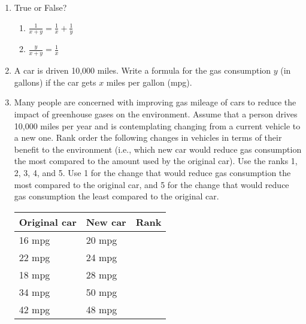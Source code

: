 \documentclass[11pt,dvipsnames]{article}
\begin{document}
\begin{enumerate}[label= {\bf  \arabic*:}]
	\item True or False?
	\begin{enumerate}
		\item $\displaystyle \frac{1}{x+y}=\frac{1}{x}+\frac{1}{y}$
		\item $\displaystyle \frac{y}{x+y}=\frac{1}{x}$
	\end{enumerate}
	\item  A car is driven 10,000 miles. Write a formula for the gas consumption $y$ (in gallons) if the car gets $x$ miles per gallon (mpg).
\item \label{item:bah}Many people are concerned with improving gas mileage of cars to reduce the impact of
greenhouse gases on the environment. Assume that a person drives 10,000 miles per year and is
contemplating changing from a current vehicle to a new one.
Rank order the following changes in vehicles in terms of their benefit to the environment (i.e.,
which new car would reduce gas consumption the most compared to the amount used by the
original car). Use the ranks 1, 2, 3, 4, and 5. Use 1 for the change that would reduce gas
consumption the most compared to the original car, and 5 for the change that would reduce gas
consumption the least compared to the original car. 


\begin{tabular}{|l|l|l|}
\hline
Original car & New car & Rank \\ \hline
16 mpg & 20 mpg &  \\ \hline
22 mpg & 24 mpg &  \\ \hline
18 mpg & 28 mpg &  \\ \hline
34 mpg & 50 mpg &  \\ \hline
42 mpg & 48 mpg &  \\ \hline
\end{tabular}


\end{enumerate}
\end{document}
